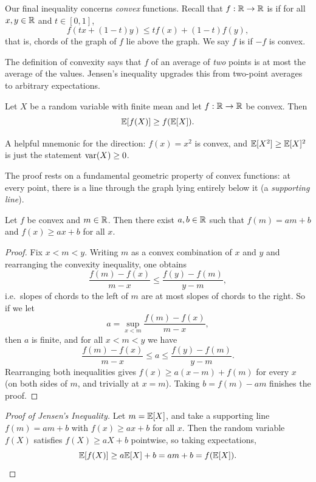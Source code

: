 \documentclass[a4paper]{scrartcl}
\begin{document}
Our final inequality concerns \emph{convex} functions. Recall that $f: \mathbb{R} \rightarrow \mathbb{R}$ is  if for all $x, y \in \mathbb{R}$ and $t \in [0, 1]$,
$$
f(tx + (1 - t)y) \leq tf(x) + (1 - t)f(y),
$$
that is, chords of the graph of $f$ lie above the graph. We say $f$ is  if $-f$ is convex.

The definition of convexity says that $f$ of an average of \emph{two} points is at most the average of the values. Jensen's inequality upgrades this from two-point averages to arbitrary expectations.

\begin{theorem}
	Let $X$ be a random variable with finite mean and let $f: \mathbb{R} \rightarrow \mathbb{R}$ be convex. Then
	$$
	\mathbb{E}[f(X)] \geq f(\mathbb{E}[X]).
	$$
\end{theorem}

A helpful mnemonic for the direction: $f(x) = x^2$ is convex, and $\mathbb{E}[X^2] \geq \mathbb{E}[X]^2$ is just the statement $\operatorname{var}(X) \geq 0$.

The proof rests on a fundamental geometric property of convex functions: at every point, there is a line through the graph lying entirely below it (a \emph{supporting line}).

\begin{lemma}
	Let $f$ be convex and $m \in \mathbb{R}$. Then there exist $a, b \in \mathbb{R}$ such that $f(m) = am + b$ and $f(x) \geq ax + b$ for all $x$.
\end{lemma}
\begin{proof}
	Fix $x < m < y$. Writing $m$ as a convex combination of $x$ and $y$ and rearranging the convexity inequality, one obtains
	$$
	\frac{f(m) - f(x)}{m - x} \leq \frac{f(y) - f(m)}{y - m},
	$$
	i.e.\ slopes of chords to the left of $m$ are at most slopes of chords to the right. So if we let
	$$
	a = \sup_{x < m} \frac{f(m) - f(x)}{m - x},
	$$
	then $a$ is finite, and for all $x < m < y$ we have
	$$
	\frac{f(m) - f(x)}{m - x} \leq a \leq \frac{f(y) - f(m)}{y - m}.
	$$
	Rearranging both inequalities gives $f(x) \geq a(x - m) + f(m)$ for every $x$ (on both sides of $m$, and trivially at $x = m$). Taking $b = f(m) - am$ finishes the proof.
\end{proof}

\begin{proof}[Proof of Jensen's Inequality]
	Let $m = \mathbb{E}[X]$, and take a supporting line $f(m) = am + b$ with $f(x) \geq ax + b$ for all $x$. Then the random variable $f(X)$ satisfies $f(X) \geq aX + b$ pointwise, so taking expectations,
	$$
	\mathbb{E}[f(X)] \geq a\mathbb{E}[X] + b = am + b = f(\mathbb{E}[X]). \qedhere
	$$
\end{proof}
\end{document}
